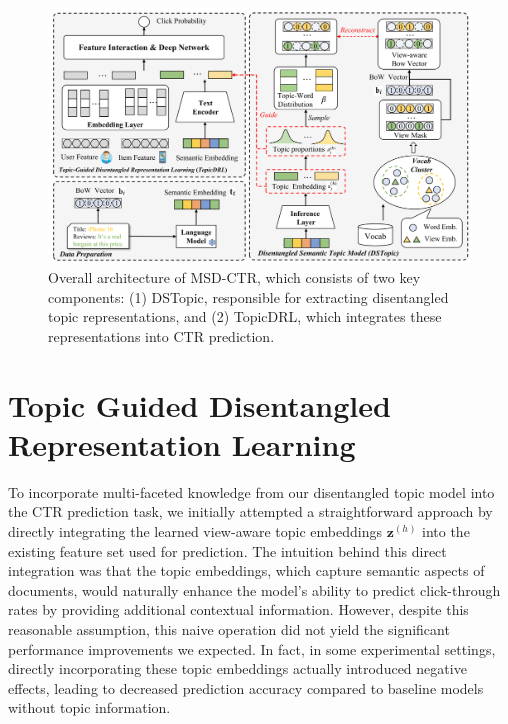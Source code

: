 \begin{figure}[t]
    \centering
    \includegraphics[width=0.9\linewidth]{Figures/Chapter3/fig2.png}
    \caption{Overall architecture of MSD-CTR, which consists of two key components: (1) DSTopic, responsible for extracting disentangled topic representations, and (2) TopicDRL, which integrates these representations into CTR prediction.}
    \label{fig:architecture}
\end{figure}


\section{Topic Guided Disentangled Representation Learning}

To incorporate multi-faceted knowledge from our disentangled topic model into the CTR prediction task, we initially attempted a straightforward approach by directly integrating the learned view-aware topic embeddings $\mathbf{z}^{(h)}$ into the existing feature set used for prediction. The intuition behind this direct integration was that the topic embeddings, which capture semantic aspects of documents, would naturally enhance the model's ability to predict click-through rates by providing additional contextual information. However, despite this reasonable assumption, this naive operation did not yield the significant performance improvements we expected. In fact, in some experimental settings, directly incorporating these topic embeddings actually introduced negative effects, leading to decreased prediction accuracy compared to baseline models without topic information.

